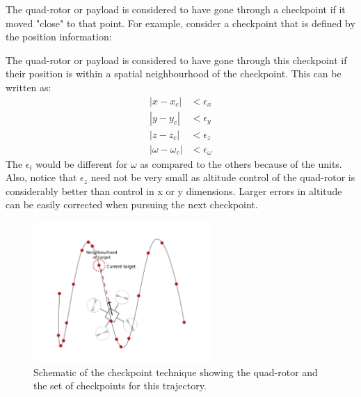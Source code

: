 \documentclass[hidelinks,BTech]{iitmdiss}
\begin{document}
The quad-rotor or payload is considered to have gone through a checkpoint if it moved "close" to that point. For example, consider a checkpoint that is defined by the position information:
\begin{equation}
  [x_c, y_c, z_y, \omega_c]
\end{equation}

The quad-rotor or payload is considered to have gone through this checkpoint if their position is within a spatial neighbourhood of the checkpoint. This can be written as:
\begin{equation} \begin{split}
  |x - x_c| &< \epsilon_x \\
  |y - y_c| &< \epsilon_y \\
  |z - z_c| &< \epsilon_z \\
  |\omega - \omega_c| &< \epsilon_\omega
\end{split} \end{equation}
The $\epsilon_i$ would be different for $\omega$ as compared to the others because of the units. Also, notice that $\epsilon_z$ need not be very small as altitude control of the quad-rotor is considerably better than control in x or y dimensions. Larger errors in altitude can be easily corrected when pursuing the next checkpoint.

\begin{figure}[H]
  \centering
    \includegraphics[width=0.6\textwidth]{checkpoint.png}
    \caption{Schematic of the checkpoint technique showing the quad-rotor and the set of checkpoints for this trajectory.}
\end{figure}
\end{document}

